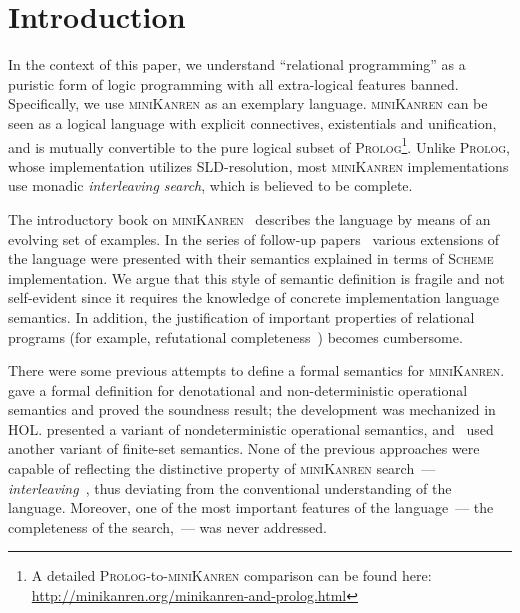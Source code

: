 \section{Introduction}

In the context of this paper, we understand ``relational programming'' as a puristic form of logic programming with all extra-logical
features banned. Specifically, we use \textsc{miniKanren} as an exemplary language. \textsc{miniKanren} can be seen as
a logical language with explicit connectives, existentials and unification, and is mutually convertible to the pure logical subset of
\textsc{Prolog}\footnote{A detailed \textsc{Prolog}-to-\textsc{miniKanren} comparison can be found here: \url{http://minikanren.org/minikanren-and-prolog.html}}.
Unlike \textsc{Prolog}, whose implementation utilizes SLD-resolution, most \textsc{miniKanren} implementations use monadic \emph{interleaving
search}, which is believed to be complete.

The introductory book on \textsc{miniKanren}~\cite{TRS} describes the language by means of an evolving set of examples. In the
series of follow-up papers~\cite{MicroKanren,CKanren,CKanren1,AlphaKanren,2016,Guided} various extensions of the language were presented with
their semantics explained in terms of \textsc{Scheme} implementation. We argue that this style of semantic definition is
fragile and not self-evident since it requires the knowledge of concrete implementation language semantics. In addition, the justification of
important properties of relational programs (for example, refutational completeness~\cite{WillThesis}) becomes cumbersome.

There were some previous attempts to define a formal semantics for \textsc{miniKanren}. \cite{MechanisingMiniKanren} gave a formal definition
for denotational and non-deterministic operational semantics and proved the soundness result; the development was mechanized in HOL. 
\cite{RelConversion} presented a variant of nondeterministic operational semantics, and~\cite{DivTest} used another variant of finite-set semantics.
None of the previous approaches were capable of reflecting the distinctive property of \textsc{miniKanren} search~--- \emph{interleaving}~\cite{Search},
thus deviating from the conventional understanding of the language. Moreover, one of the most important features of the
language~--- the completeness of the search,~--- was never addressed.

